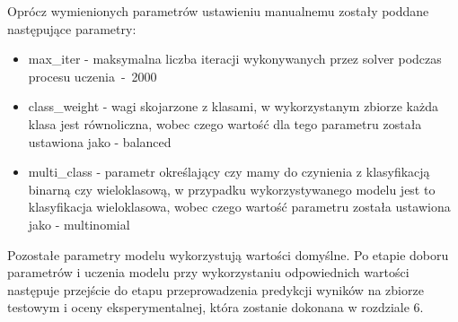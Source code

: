         Oprócz wymienionych parametrów ustawieniu manualnemu zostały poddane następujące parametry:
        \begin{itemize}
            \item max\_iter - maksymalna liczba iteracji wykonywanych przez solver podczas procesu \mbox{uczenia -  2000}
            \item class\_weight - wagi skojarzone z klasami, w wykorzystanym zbiorze każda klasa jest równoliczna, wobec czego wartość dla tego parametru została ustawiona jako - balanced
            \item multi\_class - parametr określający czy mamy do czynienia z klasyfikacją binarną czy wieloklasową, w przypadku wykorzystywanego modelu jest to klasyfikacja wieloklasowa, wobec czego wartość parametru została ustawiona jako - multinomial
        \end{itemize}
        Pozostałe parametry modelu wykorzystują wartości domyślne. Po etapie doboru parametrów i uczenia modelu przy wykorzystaniu odpowiednich wartości następuje przejście do etapu przeprowadzenia predykcji wyników na zbiorze testowym i oceny eksperymentalnej, która zostanie dokonana w rozdziale 6.
        
        \newpage
        
